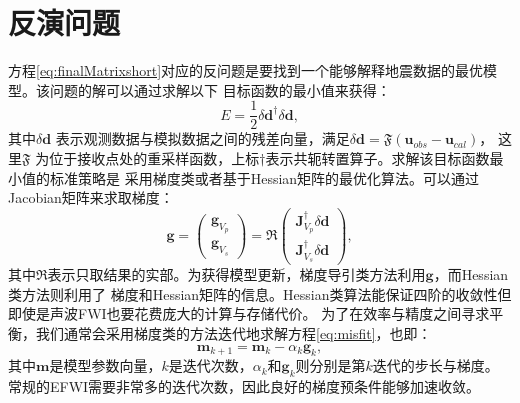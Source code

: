 \section{反演问题}
方程\eqref{eq:finalMatrixshort}对应的反问题是要找到一个能够解释地震数据的最优模型。该问题的解可以通过求解以下
目标函数的最小值来获得：
\begin{equation}
    E=\frac{1}{2}\delta\mathbf{d}^{\dagger}\delta\mathbf{d},
    \label{eq:misfit}
\end{equation}
其中$\delta\mathbf{d}$ 表示观测数据与模拟数据之间的残差向量，满足$\delta\mathbf{d}=\mathfrak{F}(\mathbf{u}_{obs}-\mathbf{u}_{cal})$，
这里$\mathfrak{F}$ 为位于接收点处的重采样函数，上标$\dagger$表示共轭转置算子。求解该目标函数最小值的标准策略是
采用梯度类或者基于Hessian矩阵的最优化算法。可以通过Jacobian矩阵来求取梯度：
\begin{equation}
        \mathbf{g}=
        \begin{pmatrix}
                \mathbf{g}_{V_p}\\
                \mathbf{g}_{V_s}
        \end{pmatrix}
        =\mathfrak{R}\begin{pmatrix}
                \mathbf{J}^{\dagger}_{V_p}\delta \mathbf{d}\\
                \mathbf{J}^{\dagger}_{V_s}\delta \mathbf{d}
        \end{pmatrix},
        \label{eq:MatrixGra1}
\end{equation}
其中$\mathfrak{R}$表示只取结果的实部。为获得模型更新，梯度导引类方法利用$\mathbf{g}$，而Hessian类方法则利用了
梯度和Hessian矩阵的信息。Hessian类算法能保证四阶的收敛性但即使是声波FWI也要花费庞大的计算与存储代价。
为了在效率与精度之间寻求平衡，我们通常会采用梯度类的方法迭代地求解方程\eqref{eq:misfit}，也即：
\begin{equation}
        \mathbf{m}_{k+1}=\mathbf{m}_{k}-\alpha_k \mathbf{g}_k,
        \label{eq:Gradientmethod}
\end{equation}
其中$\mathbf{m}$是模型参数向量，$k$是迭代次数，$\alpha_k$和$\mathbf{g}_k$则分别是第$k$迭代的步长与梯度。
常规的EFWI需要非常多的迭代次数，因此良好的梯度预条件能够加速收敛。

